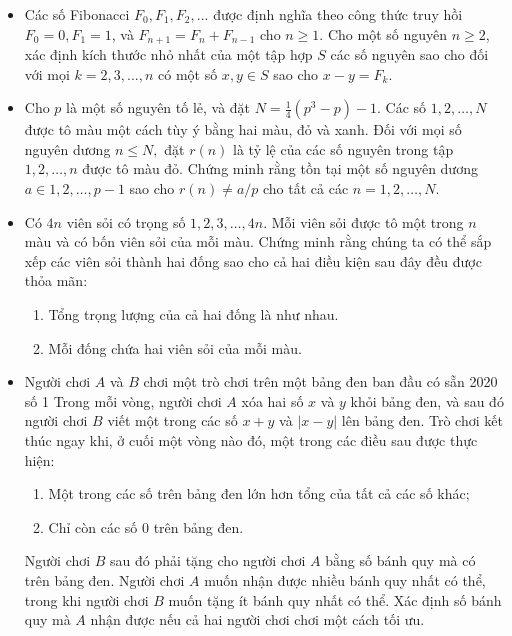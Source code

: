 \documentclass[11pt]{scrartcl}
\begin{document}
\begin{itemize}[label=, leftmargin=0em, itemsep=0.5em]
    \item \begin{btvn}
        Các số Fibonacci $F_0, F_1, F_2, . . .$ được định nghĩa theo công thức truy hồi $F_0=0, F_1=1$, và $F_{n+1}=F_n+F_{n-1}$ cho $n \ge 1$. Cho một số nguyên $n \ge 2$, xác định kích thước nhỏ nhất của một tập hợp $S$ các số nguyên sao cho đối với mọi $k=2, 3, . . . , n$ có một số $x, y \in S$ sao cho $x-y=F_k$.
    \end{btvn}

    \item \begin{btvn}
        Cho $p$ là một số nguyên tố lẻ, và đặt $N=\frac{1}{4} (p^3 -p) -1.$ Các số $1,2, \dots, N$ được tô màu một cách tùy ý bằng hai màu, đỏ và xanh. Đối với mọi số nguyên dương $n \leqslant N,$ đặt $r(n)$ là tỷ lệ của các số nguyên trong tập ${ 1,2, \dots, n }$ được tô màu đỏ.
        Chứng minh rằng tồn tại một số nguyên dương $a \in { 1,2, \dots, p-1}$ sao cho $r(n) \neq a/p$ cho tất cả các $n = 1,2, \dots , N.$
    \end{btvn}

    \item \begin{btvn}
        Có $4n$ viên sỏi có trọng số $1, 2, 3, \dots, 4n.$ Mỗi viên sỏi được tô một trong $n$ màu và có bốn viên sỏi của mỗi màu. Chứng minh rằng chúng ta có thể sắp xếp các viên sỏi thành hai đống sao cho cả hai điều kiện sau đây đều được thỏa mãn:
        \begin{enumerate}[label=(\alph*)]
            \item Tổng trọng lượng của cả hai đống là như nhau.
            \item Mỗi đống chứa hai viên sỏi của mỗi màu.
        \end{enumerate}
    \end{btvn}



    \item \begin{btvn}
        Người chơi $A$ và $B$ chơi một trò chơi trên một bảng đen ban đầu có sẵn 2020 số 1 Trong mỗi vòng, người chơi $A$ xóa hai số $x$ và $y$ khỏi bảng đen, và sau đó người chơi $B$ viết một trong các số $x+y$ và $|x-y|$ lên bảng đen. Trò chơi kết thúc ngay khi, ở cuối một vòng nào đó, một trong các điều sau được thực hiện:
        \begin{enumerate}
            \item Một trong các số trên bảng đen lớn hơn tổng của tất cả các số khác;
            \item Chỉ còn các số 0 trên bảng đen.
        \end{enumerate}
    Người chơi $B$ sau đó phải tặng cho người chơi $A$ bằng số bánh quy mà có trên bảng đen. Người chơi $A$ muốn nhận được nhiều bánh quy nhất có thể, trong khi người chơi $B$ muốn tặng ít bánh quy nhất có thể. Xác định số bánh quy mà $A$ nhận được nếu cả hai người chơi chơi một cách tối ưu.
    \end{btvn}


\end{itemize}
\end{document}
